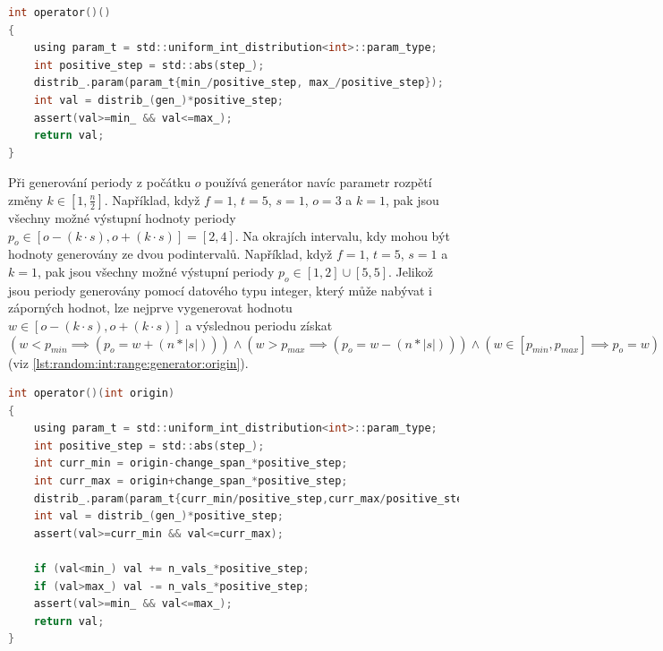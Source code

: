 \begin{lstlisting}[caption={~Metoda pro náhodné generování periody indikátoru},label={lst:random:int:range:generator},captionpos=t,abovecaptionskip=-\medskipamount,belowcaptionskip=\medskipamount,language=C]
int operator()()
{
    using param_t = std::uniform_int_distribution<int>::param_type;
    int positive_step = std::abs(step_);
    distrib_.param(param_t{min_/positive_step, max_/positive_step});
    int val = distrib_(gen_)*positive_step;
    assert(val>=min_ && val<=max_);
    return val;
}
\end{lstlisting}

Při generování periody z počátku $o$ používá generátor navíc parametr rozpětí změny $k\in[1,\frac{n}{2}]$.
Například, když $f=1$, $t=5$, $s=1$, $o=3$ a $k=1$, pak jsou všechny možné výstupní hodnoty periody $ p_o \in [o-(k\cdot s), o+(k\cdot s)]=[2, 4]$.
Na okrajích intervalu, kdy mohou být hodnoty generovány ze dvou podintervalů. Například, když $f=1$, $t=5$, $s=1$ a $k=1$, pak jsou všechny možné výstupní periody $p_o \in [1, 2] \cup [5, 5]$.
Jelikož jsou periody generovány pomocí datového typu integer, který může nabývat i záporných hodnot, lze nejprve vygenerovat hodnotu $ w \in [o-(k\cdot s), o+(k\cdot s)]$ a výslednou periodu získat $(w<p_{min}\implies(p_o=w+(n*|s|))) \land (w>p_{max}\implies(p_o=w-(n*|s|))) \land (w \in [p_{min}, p_{max}]\implies p_o=w)$ (viz \ref{lst:random:int:range:generator:origin}).

\begin{lstlisting}[caption={~Metoda pro náhodné generování periody z počátku},label={lst:random:int:range:generator:origin},captionpos=t,abovecaptionskip=-\medskipamount,belowcaptionskip=\medskipamount,language=C]
int operator()(int origin)
{
    using param_t = std::uniform_int_distribution<int>::param_type;
    int positive_step = std::abs(step_);
    int curr_min = origin-change_span_*positive_step;
    int curr_max = origin+change_span_*positive_step;
    distrib_.param(param_t{curr_min/positive_step,curr_max/positive_step});
    int val = distrib_(gen_)*positive_step;
    assert(val>=curr_min && val<=curr_max);

    if (val<min_) val += n_vals_*positive_step;
    if (val>max_) val -= n_vals_*positive_step;
    assert(val>=min_ && val<=max_);
    return val;
}
\end{lstlisting}

